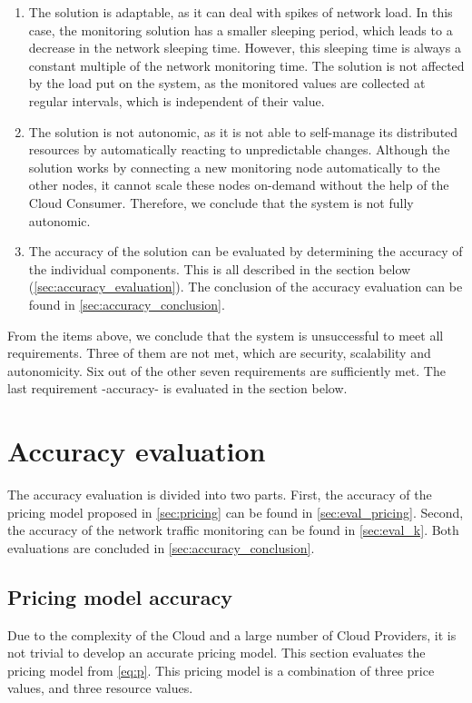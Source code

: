 \begin{enumerate}
    \item The solution is adaptable, as it can deal with spikes of network load. In this case, the monitoring solution has a smaller sleeping period, which leads to a decrease in the network sleeping time. However, this sleeping time is always a constant multiple of the network monitoring time. The solution is not affected by the load put on the system, as the monitored values are collected at regular intervals, which is independent of their value.
    \item The solution is not autonomic, as it is not able to self-manage its distributed resources by automatically reacting to unpredictable changes. Although the solution works by connecting a new monitoring node automatically to the other nodes, it cannot scale these nodes on-demand without the help of the Cloud Consumer. Therefore, we conclude that the system is not fully autonomic.
    \item The accuracy of the solution can be evaluated by determining the accuracy of the individual components. This is all described in the section below (\autoref{sec:accuracy_evaluation}). The conclusion of the accuracy evaluation can be found in \autoref{sec:accuracy_conclusion}.
\end{enumerate}

\noindent
From the items above, we conclude that the system is unsuccessful to meet all requirements. Three of them are not met, which are security, scalability and autonomicity. Six out of the other seven requirements are sufficiently met. The last requirement -accuracy- is evaluated in the section below.

\section{Accuracy evaluation} \label{sec:accuracy_evaluation}
The accuracy evaluation is divided into two parts. First, the accuracy of the pricing model proposed in \autoref{sec:pricing} can be found in \autoref{sec:eval_pricing}. Second, the accuracy of the network traffic monitoring can be found in \autoref{sec:eval_k}. Both evaluations are concluded in \autoref{sec:accuracy_conclusion}.

\subsection{Pricing model accuracy} \label{sec:eval_pricing}
Due to the complexity of the Cloud and a large number of Cloud Providers, it is not trivial to develop an accurate pricing model. This section evaluates the pricing model from \autoref{eq:p}. This pricing model is a combination of three price values, and three resource values.\\

